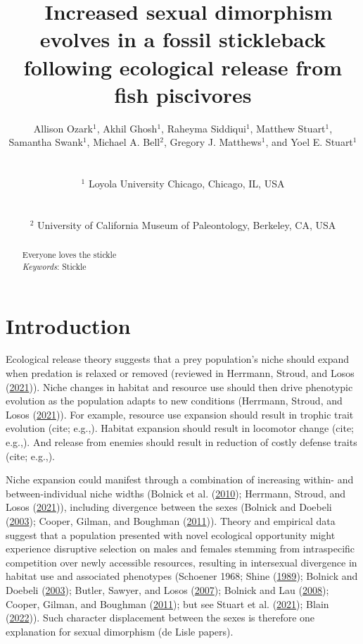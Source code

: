 \documentclass[
  12pt,
]{article}
\title{~\Large Increased sexual dimorphism evolves in a fossil
stickleback following ecological release from fish piscivores}
\author{\large Allison Ozark\(^1\), Akhil Ghosh\(^1\), Raheyma
Siddiqui\(^1\), Matthew Stuart\(^1\),\\
\large  Samantha Swank\(^1\), Michael A. Bell\(^2\), Gregory J.
Matthews\(^1\), and Yoel E. Stuart\(^1\) \vspace{-1.1mm}\\
\strut \\
\large \(^1\) Loyola University Chicago, Chicago, IL, USA
\vspace{-1.1mm}\\
\strut \\
\large \(^2\) University of California Museum of Paleontology, Berkeley,
CA, USA \vspace{-1.1mm}\\}
\date{}
\begin{document}
\maketitle
\begin{abstract}
Everyone loves the stickle \vspace{2mm}\\
\emph{Keywords}: Stickle
\end{abstract}

\newcommand{\iid}{\overset{iid}{\sim}}

\newpage

\hypertarget{sec:intro}{%
\section{Introduction}\label{sec:intro}}

Ecological release theory suggests that a prey population's niche should
expand when predation is relaxed or removed (reviewed in Herrmann,
Stroud, and Losos (\protect\hyperlink{ref-Herrmann2021}{2021})). Niche
changes in habitat and resource use should then drive phenotypic
evolution as the population adapts to new conditions (Herrmann, Stroud,
and Losos (\protect\hyperlink{ref-Herrmann2021}{2021})). For example,
resource use expansion should result in trophic trait evolution (cite;
e.g.,). Habitat expansion should result in locomotor change (cite;
e.g.,). And release from enemies should result in reduction of costly
defense traits (cite; e.g.,).

Niche expansion could manifest through a combination of increasing
within- and between-individual niche widths (Bolnick et al.
(\protect\hyperlink{ref-Bolnick2010}{2010}); Herrmann, Stroud, and Losos
(\protect\hyperlink{ref-Herrmann2021}{2021})), including divergence
between the sexes (Bolnick and Doebeli
(\protect\hyperlink{ref-Bolnick2003}{2003}); Cooper, Gilman, and
Boughman (\protect\hyperlink{ref-Cooper2011}{2011})). Theory and
empirical data suggest that a population presented with novel ecological
opportunity might experience disruptive selection on males and females
stemming from intraspecific competition over newly accessible resources,
resulting in intersexual divergence in habitat use and associated
phenotypes (Schoener 1968; Shine
(\protect\hyperlink{ref-Shine1989}{1989}); Bolnick and Doebeli
(\protect\hyperlink{ref-Bolnick2003}{2003}); Butler, Sawyer, and Losos
(\protect\hyperlink{ref-Butler2007}{2007}); Bolnick and Lau
(\protect\hyperlink{ref-Bolnick2008}{2008}); Cooper, Gilman, and
Boughman (\protect\hyperlink{ref-Cooper2011}{2011}); but see Stuart et
al. (\protect\hyperlink{ref-Stuart2021}{2021}); Blain
(\protect\hyperlink{ref-Blain2022}{2022})). Such character displacement
between the sexes is therefore one explanation for sexual dimorphism (de
Lisle papers).
\end{document}
